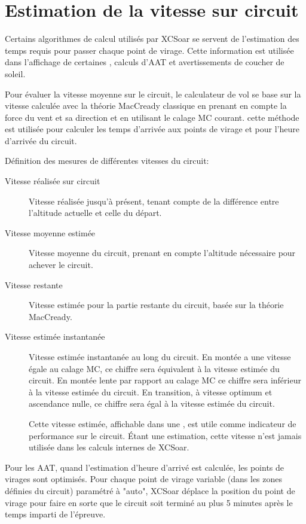 \section{Estimation de la vitesse sur circuit}\label{sec:task-speed-estim}

Certains algorithmes de calcul utilisés par XCSoar se servent de l'estimation des temps requis pour passer chaque point de virage. Cette information est utilisée dans l'affichage de certaines {\InfoBox}, calculs d'AAT et avertissements de coucher de soleil. 

Pour évaluer la vitesse moyenne sur le circuit, le calculateur de vol se base sur la vitesse calculée avec la théorie MacCready classique en prenant en compte la force du vent et sa direction et en utilisant le calage MC courant. cette méthode est utilisée pour calculer les temps d'arrivée aux points de virage et pour l'heure d'arrivée du circuit.

Définition des mesures de différentes vitesses du circuit:
\begin{description}
\item[Vitesse réalisée sur circuit]  Vitesse réalisée jusqu'à présent, tenant compte de la différence entre l'altitude actuelle et celle du départ.
\item[Vitesse moyenne estimée]  Vitesse moyenne du circuit, prenant en compte l'altitude nécessaire pour achever le circuit.
\item[Vitesse restante]  Vitesse estimée pour la partie restante du circuit, basée sur la théorie MacCready.
\item[Vitesse estimée instantanée]  Vitesse estimée instantanée au long du circuit. En montée a une vitesse égale au calage MC, ce chiffre sera équivalent à la vitesse estimée du circuit. En montée lente par rapport au calage MC ce chiffre sera inférieur à la vitesse estimée du circuit. En transition, à vitesse optimum et ascendance nulle, ce chiffre sera égal  à la vitesse estimée du circuit.

Cette vitesse estimée, affichable dans une {\InfoBox}, est utile comme indicateur de performance sur le circuit. Étant une estimation, cette vitesse n'est jamais utilisée dans les calculs internes de XCSoar.
\end{description}

Pour les AAT, quand l'estimation d'heure d'arrivé est calculée, les points de virages sont optimisés. \tip Pour chaque point de virage variable (dans les zones définies du circuit) paramétré à "auto", XCSoar déplace la position du point de virage pour faire en sorte que le circuit soit terminé au plus 5 minutes après le temps imparti de l'épreuve.

